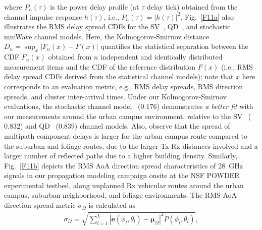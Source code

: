\documentclass[10pt, twocolumn]{IEEEtran}
\begin{document}
{where $P_{h}(\tau)$ is the power delay profile (at $\tau$ delay tick) obtained from the channel impulse response $h(\tau)$, i.e., $P_{h}(\tau){=}|h(\tau)|^{2}$. Fig.~\ref{F11a} also illustrates the RMS delay spread CDFs for the SV~\cite{SV_Molisch}, QD~\cite{QDC_NIST}, and stochastic~\cite{Indoor60G} mmWave channel models. Here, the Kolmogorov-Smirnov distance $D_{n}{=}\sup_{x}|F_{n}(x){-}F(x)|$ quantifies the statistical separation between the CDF $F_{n}(x)$ obtained from $n$ independent and identically distributed measurement items and the CDF of the reference distribution $F(x)$ (i.e., RMS delay spread CDFs derived from the statistical channel models); note that $x$ here corresponds to an evaluation metric, e.g., RMS delay spreads, RMS direction spreads, and cluster inter-arrival times. Under our Kolmogorov-Smirnov evaluations, the stochastic channel model~\cite{Indoor60G} ($0.176$) demonstrates \emph{a better fit} with our measurements around the urban campus environment, relative to the SV~\cite{SV_Molisch} ($0.832$) and QD~\cite{QDC_NIST} ($0.839$) channel models. Also, observe that the spread of multipath component delays is larger for the urban campus route compared to the suburban and foliage routes, due to the larger Tx-Rx distances involved and a larger number of reflected paths due to a higher building density. Similarly, Fig.~\ref{F11b} depicts the RMS AoA direction spread characteristics of \SI{28}{\giga\hertz} signals in our propagation modeling campaign onsite at the NSF POWDER experimental testbed, along unplanned Rx vehicular routes around the urban campus, suburban neighborhood, and foliage environments. The RMS AoA direction spread metric $\sigma_{\Omega}$ is calculated as~\cite{Indoor60G}
\begin{align}\label{RMS_DirS}
    \sigma_{\Omega} = \sqrt{\sum_{l=1}^{L}|\mathbf{e}(\phi_{l}, \theta_{l}) - \boldsymbol{\mu}_{\Omega}|^{2}P(\phi_{l}, \theta_{l})},
\end{align}
}
\end{document}
